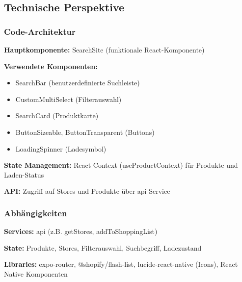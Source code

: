 \documentclass[12pt, a4paper]{report} %
\begin{document}
\subsection{Technische Perspektive}

\subsubsection{Code-Architektur}

\textbf{Hauptkomponente:} SearchSite (funktionale React-Komponente)

\noindent\textbf{Verwendete Komponenten:}
\begin{itemize}
    \item SearchBar (benutzerdefinierte Suchleiste)
    \item CustomMultiSelect (Filterauswahl)
    \item SearchCard (Produktkarte)
    \item ButtonSizeable, ButtonTransparent (Buttons)
    \item LoadingSpinner (Ladesymbol)
\end{itemize}

\noindent\textbf{State Management:} React Context (useProductContext) für Produkte und Laden-Status

\noindent\textbf{API:} Zugriff auf Stores und Produkte über api-Service

\subsubsection{Abhängigkeiten}

\textbf{Services:} api (z.B. getStores, addToShoppingList)

\noindent\textbf{State:} Produkte, Stores, Filterauswahl, Suchbegriff, Ladezustand

\noindent\textbf{Libraries:} expo-router, @shopify/flash-list, lucide-react-native (Icons), React Native Komponenten
\end{document}
